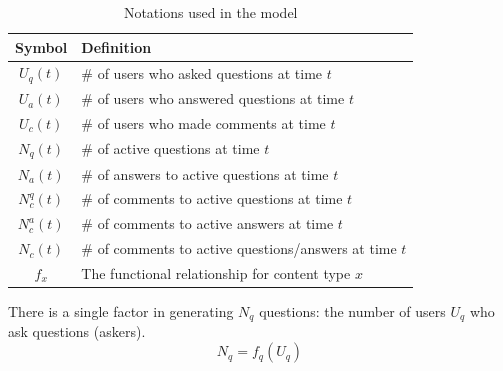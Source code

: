 \begin{table}[thb]
	\vspace{-0.5\baselineskip}
	\caption{Notations used in the model}
    \vspace{-\baselineskip}
    \label{tab:notations}
	\begin{center}    
	\begin{tabular}{cl}
	\toprule Symbol & Definition\\ \midrule
	$U_q(t)$ & \# of users who asked questions at time $t$\\ 
	$U_a(t)$ & \# of users who answered questions at time $t$\\
	$U_c(t)$ & \# of users who made comments at time $t$\\
	$N_q(t)$ & \# of active questions at time $t$\\
	$N_a(t)$ & \# of answers to active questions at time $t$\\
	$N_c^q(t)$ & \# of comments to active questions at time $t$\\
	$N_c^a(t)$ & \# of comments to active answers at time $t$\\
    $N_c(t)$ & \# of comments to active questions/answers at time $t$\\
	$f_x$ & The functional relationship for content type $x$\\ \bottomrule
	\end{tabular}
    \end{center}
    \vspace{-\baselineskip}   
\end{table}

There is a single factor in generating $N_q$ questions: the number of users $U_q$ who ask questions (askers).
\begin{equation*}
N_q = f_q(U_q)
\end{equation*}

